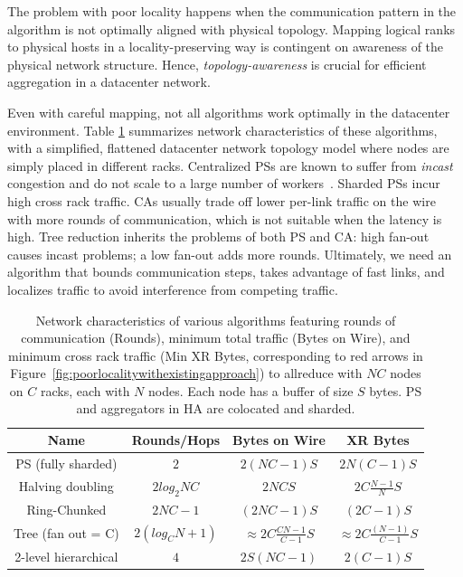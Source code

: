 The problem with poor locality happens when the communication pattern in the algorithm is not optimally aligned with physical topology. Mapping logical ranks to physical hosts in a locality-preserving way is contingent on awareness of the physical network structure. Hence, \textit{topology-awareness} is crucial for efficient aggregation in a datacenter network. %

Even with careful mapping, not all algorithms work optimally in the datacenter environment. Table \ref{table:algoCharacterization} summarizes network characteristics of these algorithms, with a simplified, flattened datacenter network topology model where nodes are simply placed in different racks. Centralized PSs are known to suffer from \textit{incast} congestion and do not scale to a large number of workers~\cite{firecaffe,Geng:2018:HHP:3229543.3229544}. Sharded PSs incur high cross rack traffic. CAs usually trade off lower per-link traffic on the wire with more rounds of communication, which is not suitable when the latency is high. Tree reduction inherits the problems of both PS and CA: high fan-out causes incast problems; a low fan-out adds more rounds. Ultimately, we need an algorithm that bounds communication steps, takes advantage of fast links, and localizes traffic to avoid interference from competing traffic.

\begin{table}[ht]
	\centering
    \footnotesize
	\begin{tabular}{|c|c|c|c|}
		\hline 
		Name & Rounds/Hops & Bytes on Wire & XR Bytes \\
		\hline
		PS (fully sharded)  & $2$ & $2(NC-1)S$ & $2N(C-1)S$  \\
		\hline
		Halving doubling & $2log_2NC$ & $2NCS$ & $2C\frac{N-1}{N}S$ \\ 
		\hline 
		Ring-Chunked & $2NC-1$ & $(2NC-1)S$ & $(2C-1)S$ \\
		\hline
        Tree (fan out = C) & $2(log_CN + 1)$ & $\approx2C\frac{CN-1}{C-1}S $ & $\approx2C\frac{(N-1)}{C-1}S$ \\ %
        \hline
        \hline
        2-level hierarchical & $4$ & $2S(NC-1)$ & $2(C-1)S$ \\
		\hline
	\end{tabular}
	\caption{Network characteristics of various algorithms featuring rounds of communication (Rounds), minimum total traffic (Bytes on Wire), and minimum cross rack traffic (Min XR Bytes, corresponding to red arrows in Figure~\ref{fig:poorlocalitywithexistingapproach}) to allreduce with $NC$ nodes on $C$ racks, each with $N$ nodes. Each node has a buffer of size $S$ bytes. PS and aggregators in HA are colocated and sharded.}
	\label{table:algoCharacterization}
\end{table}

